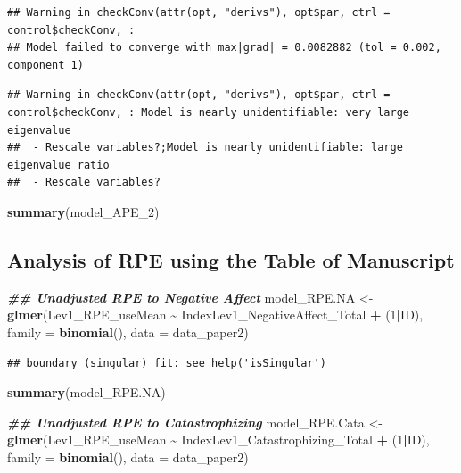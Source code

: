\documentclass[
  12pt,
]{article}
\newenvironment{Shaded}{\begin{snugshade}}{\end{snugshade}}
\newcommand{\AttributeTok}[1]{\textcolor[rgb]{0.13,0.29,0.53}{#1}}
\newcommand{\DecValTok}[1]{\textcolor[rgb]{0.00,0.00,0.81}{#1}}
\newcommand{\DocumentationTok}[1]{\textcolor[rgb]{0.56,0.35,0.01}{\textbf{\textit{#1}}}}
\newcommand{\FunctionTok}[1]{\textcolor[rgb]{0.13,0.29,0.53}{\textbf{#1}}}
\newcommand{\NormalTok}[1]{#1}
\newcommand{\OtherTok}[1]{\textcolor[rgb]{0.56,0.35,0.01}{#1}}
\newcommand{\SpecialCharTok}[1]{\textcolor[rgb]{0.81,0.36,0.00}{\textbf{#1}}}
\begin{document}
\begin{verbatim}
## Warning in checkConv(attr(opt, "derivs"), opt$par, ctrl = control$checkConv, :
## Model failed to converge with max|grad| = 0.0082882 (tol = 0.002, component 1)
\end{verbatim}

\begin{verbatim}
## Warning in checkConv(attr(opt, "derivs"), opt$par, ctrl = control$checkConv, : Model is nearly unidentifiable: very large eigenvalue
##  - Rescale variables?;Model is nearly unidentifiable: large eigenvalue ratio
##  - Rescale variables?
\end{verbatim}

\begin{Shaded}
\begin{Highlighting}[]
\FunctionTok{summary}\NormalTok{(model\_APE\_2)}
\end{Highlighting}
\end{Shaded}

\hypertarget{analysis-of-rpe-using-the-table-of-manuscript}{%
\subsection{Analysis of RPE using the Table of
Manuscript}\label{analysis-of-rpe-using-the-table-of-manuscript}}

\begin{Shaded}
\begin{Highlighting}[]
\DocumentationTok{\#\# Unadjusted RPE to Negative Affect}
\NormalTok{model\_RPE.NA }\OtherTok{\textless{}{-}} \FunctionTok{glmer}\NormalTok{(Lev1\_RPE\_useMean }\SpecialCharTok{\textasciitilde{}}\NormalTok{ IndexLev1\_NegativeAffect\_Total }\SpecialCharTok{+}\NormalTok{ (}\DecValTok{1}\SpecialCharTok{|}\NormalTok{ID), }\AttributeTok{family =} \FunctionTok{binomial}\NormalTok{(), }\AttributeTok{data =}\NormalTok{ data\_paper2)}
\end{Highlighting}
\end{Shaded}

\begin{verbatim}
## boundary (singular) fit: see help('isSingular')
\end{verbatim}

\begin{Shaded}
\begin{Highlighting}[]
\FunctionTok{summary}\NormalTok{(model\_RPE.NA)}

 \DocumentationTok{\#\# Unadjusted RPE to Catastrophizing}
\NormalTok{model\_RPE.Cata }\OtherTok{\textless{}{-}} \FunctionTok{glmer}\NormalTok{(Lev1\_RPE\_useMean }\SpecialCharTok{\textasciitilde{}}\NormalTok{ IndexLev1\_Catastrophizing\_Total }\SpecialCharTok{+}\NormalTok{ (}\DecValTok{1}\SpecialCharTok{|}\NormalTok{ID), }\AttributeTok{family =} \FunctionTok{binomial}\NormalTok{(), }\AttributeTok{data =}\NormalTok{ data\_paper2)}
\end{Highlighting}
\end{Shaded}
\end{document}
